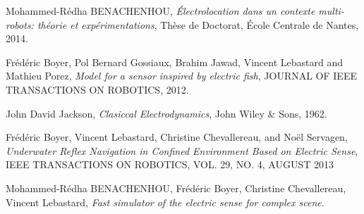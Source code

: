 \documentclass[11pt,a4paper,french]{article}
\begin{document}
\begin{thebibliography}{99}
 Mohammed-Rédha BENACHENHOU, \emph{Électrolocation dans un contexte multi-robots: théorie et expérimentations}, Thèse de Doctorat, École Centrale de Nantes, 2014. 

 Frédéric Boyer, Pol Bernard Gossiaux, Brahim Jawad, Vincent Lebastard and Mathieu Porez, \emph{Model for a sensor inspired by electric fish}, JOURNAL OF IEEE TRANSACTIONS ON ROBOTICS, 2012.

 John David Jackson, \emph{Clasiccal Electrodynamics}, John Wiley \& Sons, 1962.

 Frédéric Boyer, Vincent Lebastard, Christine Chevallereau, and Noël Servagen, \emph{Underwater Reflex Navigation in Confined Environment Based on Electric Sense}, IEEE TRANSACTIONS ON ROBOTICS, VOL. 29, NO. 4, AUGUST 2013

 Mohammed-Rédha BENACHENHOU,  Frédéric Boyer, Christine Chevallereau, Vincent Lebastard, \emph{Fast simulator of the electric sense for complex scene}.

\end{thebibliography}
\IMTAcoverpage
\end{document}

